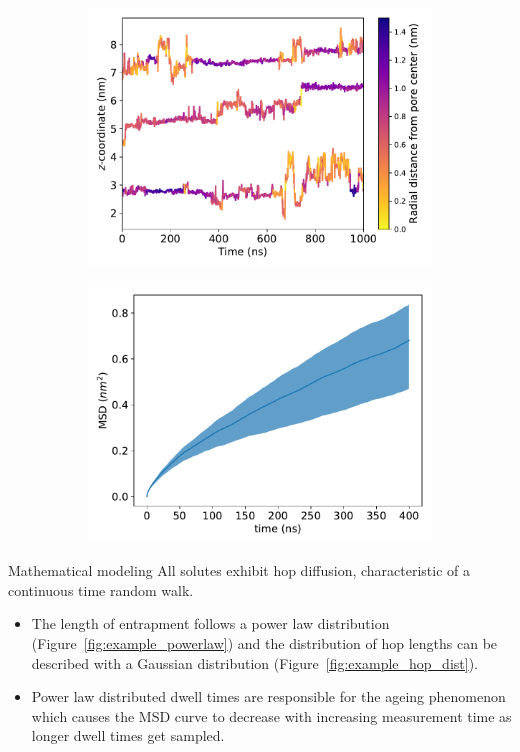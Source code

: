 \documentclass{article}
\begin{document}
  \begin{figure}
  \centering
  \begin{subfigure}{0.49\textwidth}
  \includegraphics[width=\linewidth]{colorful_example_ztraces.pdf}
  \caption{}\label{fig:example_ztraces}
  \end{subfigure}
  \begin{subfigure}{0.49\textwidth}
  \includegraphics[width=\linewidth]{example_msd.pdf}
  \caption{}\label{fig:example_msd}
  \end{subfigure}
  \caption{}\label{fig:qualitative_mechanisms}
  \end{figure}
  	
  Mathematical modeling 
  All solutes exhibit hop diffusion, characteristic of a continuous time random walk.	
  \begin{itemize}
  	\item The length of entrapment follows a power law distribution 
  	(Figure~\ref{fig:example_powerlaw}) and the distribution of hop lengths can be 
  	described with a Gaussian distribution (Figure~\ref{fig:example_hop_dist}).
  	\item Power law distributed dwell times are responsible for the ageing phenomenon
  	which causes the MSD curve to decrease with increasing measurement time as longer
  	dwell times get sampled.
  \end{itemize}
  
\end{document}
